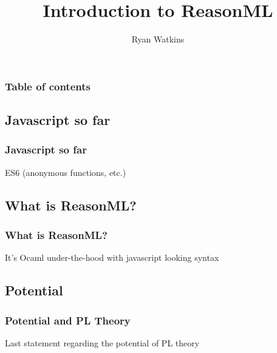 \documentclass{beamer}
\author{Ryan Watkins}
\title{Introduction to ReasonML}
\begin{document}
\begin{frame}
  \titlepage
\end{frame}

\begin{frame}
  \frametitle{Table of contents}
  \tableofcontents
\end{frame}

\begin{frame}
  \section{Javascript so far}
    \frametitle{Javascript so far}
    ES6 (anonymous functions, etc.)
\end{frame}

\begin{frame}
  \section{What is ReasonML?}
    \frametitle{What is ReasonML?}
    It's Ocaml under-the-hood with javascript looking syntax
\end{frame}

\begin{frame}
  \section{Potential}
    \frametitle{Potential and PL Theory}
    Last statement regarding the potential of PL theory
\end{frame}
\end{document}
